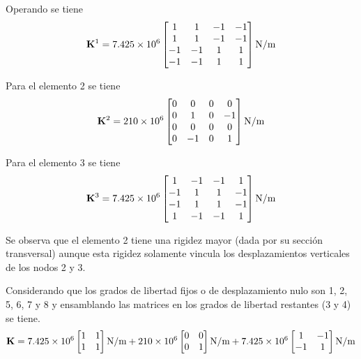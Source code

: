 Operando se tiene
\begin{equation}
{\bf K}^1 = 7.425 \times 10^6
\left[
\begin{matrix}
1 & 1 & -1 & -1 \\
1 & 1 & -1 & -1\\
-1 & -1 &  1 & 1\\
-1 & -1 & 1 & 1
\end{matrix}
\right]
\text{N/m}
\end{equation}

Para el elemento 2 se tiene
\begin{equation}
{\bf K}^2 = 210 \times 10^6
\left[
\begin{matrix}
0 & 0 & 0 & 0 \\
0 & 1 & 0 & -1\\
0 & 0 &  0 & 0\\
0 & -1 & 0 & 1
\end{matrix}
\right]
\text{N/m}
\end{equation}

Para el elemento 3 se tiene
\begin{equation}
{\bf K}^3 = 7.425 \times 10^6
\left[
\begin{matrix}
1 & -1 & -1 & 1 \\
-1 & 1 & 1 & -1\\
-1 & 1 &  1 & -1\\
1 & -1 & -1 & 1
\end{matrix}
\right]
\text{N/m}
\end{equation}



Se observa que el elemento 2 tiene una rigidez mayor (dada por su sección transversal) aunque esta rigidez solamente vincula los desplazamientos verticales de los nodos 2 y 3.

Considerando que los grados de libertad fijos o de desplazamiento nulo son 1, 2, 5, 6, 7 y 8 y ensamblando las matrices en los grados de libertad restantes (3 y 4) se tiene.
%
\begin{equation}
{\bf K} =
7.425 \times 10^6
\left[
\begin{matrix}
1 & 1 \\
1 & 1 
\end{matrix}
\right]
\text{N/m}
+
210 \times 10^6
\left[
\begin{matrix}
0 & 0 \\
0 & 1 
\end{matrix}
\right]
\text{N/m}
+
7.425 \times 10^6
\left[
\begin{matrix}
1 & -1 \\
-1 & 1 
\end{matrix}
\right]
\text{N/m}
\end{equation}


